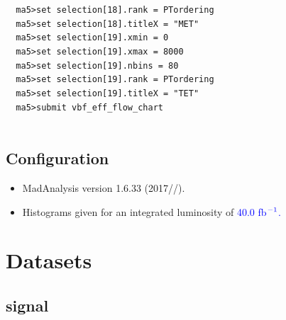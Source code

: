 \documentclass[a4paper, 10pt]{article}
\begin{document}
\texttt{ }\texttt{ }\texttt{ma5>set selection[18].rank = PTordering\\
}
\texttt{ }\texttt{ }\texttt{ma5>set selection[18].titleX = "MET"\\
}
\texttt{ }\texttt{ }\texttt{ma5>set selection[19].xmin = 0\\
}
\texttt{ }\texttt{ }\texttt{ma5>set selection[19].xmax = 8000\\
}
\texttt{ }\texttt{ }\texttt{ma5>set selection[19].nbins = 80\\
}
\texttt{ }\texttt{ }\texttt{ma5>set selection[19].rank = PTordering\\
}
\texttt{ }\texttt{ }\texttt{ma5>set selection[19].titleX = "TET"\\
}
\texttt{ }\texttt{ }\texttt{ma5>submit vbf\_eff\_flow\_chart\\
}
\texttt{ }\texttt{ }\subsection{ Configuration}

\begin{itemize}
  \item MadAnalysis version 1.6.33 (2017//).
   \item Histograms given for an integrated luminosity of \textcolor{blue}{40.0}\textcolor{blue}{ fb}$^{\textcolor{blue}{-1}}$\textcolor{blue}{.}
\textcolor{blue}{}
\end{itemize}
\newpage
\section{ Datasets}

\subsection{ signal}
\end{document}
